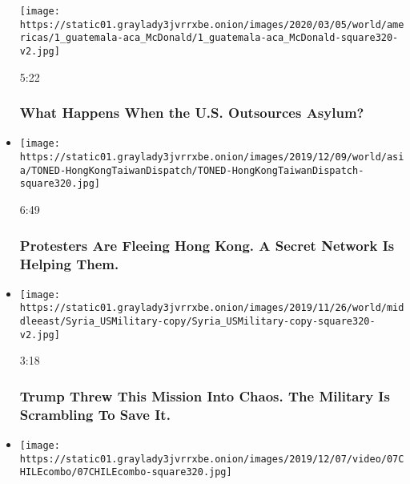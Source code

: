 \begin{itemize}
  \texttt{[image: https://static01.graylady3jvrrxbe.onion/images/2020/03/05/world/americas/1\_guatemala-aca\_McDonald/1\_guatemala-aca\_McDonald-square320-v2.jpg]}

  5:22

  \hypertarget{what-happens-when-the-us-outsources-asylum}{%
  \subsubsection{What Happens When the U.S. Outsources
  Asylum?}\label{what-happens-when-the-us-outsources-asylum}}
\item
  \href{https://www.nytimes3xbfgragh.onion/video/world/asia/100000006864895/hong-kong-protests-taiwan-secret-network.html?action=click\&module=video-series-bar\&region=header\&pgtype=Article\&playlistId=video/on-the-ground}{}

  \texttt{[image: https://static01.graylady3jvrrxbe.onion/images/2019/12/09/world/asia/TONED-HongKongTaiwanDispatch/TONED-HongKongTaiwanDispatch-square320.jpg]}

  6:49

  \hypertarget{protesters-are-fleeing-hong-kong-a-secret-network-is-helping-them}{%
  \subsubsection{Protesters Are Fleeing Hong Kong. A Secret Network Is
  Helping
  Them.}\label{protesters-are-fleeing-hong-kong-a-secret-network-is-helping-them}}
\item
  \href{https://www.nytimes3xbfgragh.onion/video/world/middleeast/100000006821104/trump-syria-military.html?action=click\&module=video-series-bar\&region=header\&pgtype=Article\&playlistId=video/on-the-ground}{}

  \texttt{[image: https://static01.graylady3jvrrxbe.onion/images/2019/11/26/world/middleeast/Syria\_USMilitary-copy/Syria\_USMilitary-copy-square320-v2.jpg]}

  3:18

  \hypertarget{trump-threw-this-mission-into-chaos-the-military-is-scrambling-to-save-it}{%
  \subsubsection{Trump Threw This Mission Into Chaos. The Military Is
  Scrambling To Save
  It.}\label{trump-threw-this-mission-into-chaos-the-military-is-scrambling-to-save-it}}
\item
  \texttt{[image: https://static01.graylady3jvrrxbe.onion/images/2019/12/07/video/07CHILEcombo/07CHILEcombo-square320.jpg]}


\end{itemize}
